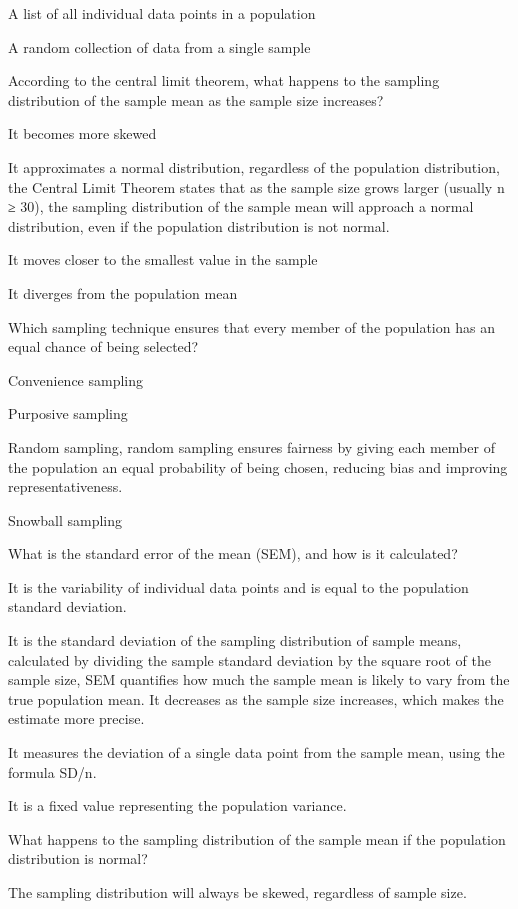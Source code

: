 \documentclass[
  letterpaper,
  DIV=11,
  numbers=noendperiod]{scrreprt}
\begin{document}
A list of all individual data points in a population

A random collection of data from a single sample

According to the central limit theorem, what happens to the sampling
distribution of the sample mean as the sample size increases?

It becomes more skewed

It approximates a normal distribution, regardless of the population
distribution, the Central Limit Theorem states that as the sample size
grows larger (usually n ≥ 30), the sampling distribution of the sample
mean will approach a normal distribution, even if the population
distribution is not normal.

It moves closer to the smallest value in the sample

It diverges from the population mean

Which sampling technique ensures that every member of the population has
an equal chance of being selected?

Convenience sampling

Purposive sampling

Random sampling, random sampling ensures fairness by giving each member
of the population an equal probability of being chosen, reducing bias
and improving representativeness.

Snowball sampling

What is the standard error of the mean (SEM), and how is it calculated?

It is the variability of individual data points and is equal to the
population standard deviation.

It is the standard deviation of the sampling distribution of sample
means, calculated by dividing the sample standard deviation by the
square root of the sample size, SEM quantifies how much the sample mean
is likely to vary from the true population mean. It decreases as the
sample size increases, which makes the estimate more precise.

It measures the deviation of a single data point from the sample mean,
using the formula SD/n.~

It is a fixed value representing the population variance.

What happens to the sampling distribution of the sample mean if the
population distribution is normal?

The sampling distribution will always be skewed, regardless of sample
size.
\end{document}
